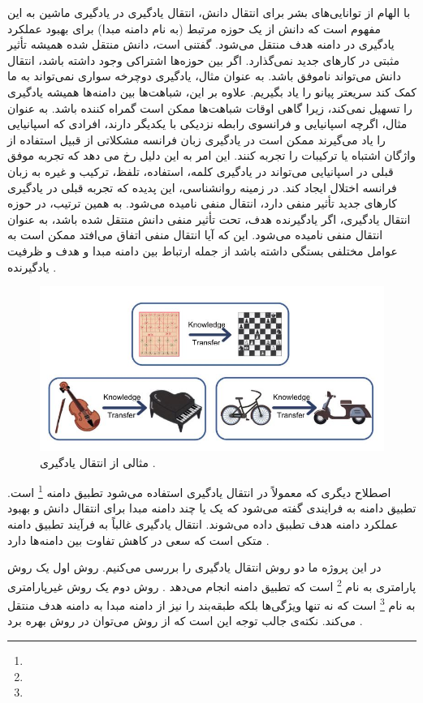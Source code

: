 {	 با الهام از توانایی‌های بشر برای انتقال دانش، انتقال یادگیری در یادگیری ماشین به این مفهوم است که دانش از یک حوزه مرتبط (به نام دامنه مبدا) برای بهبود عملکرد یادگیری در دامنه هدف منتقل می‌شود. گفتنی است، دانش منتقل شده همیشه تأثیر مثبتی در کارهای جدید نمی‌گذارد. اگر بین حوزه‌ها اشتراکی وجود داشته باشد، انتقال دانش می‌تواند ناموفق باشد. به عنوان مثال، یادگیری دوچرخه سواری نمی‌تواند به ما کمک کند سریعتر پیانو را یاد بگیریم. علاوه بر این، شباهت‌ها بین دامنه‌ها همیشه یادگیری را تسهیل نمی‌کند، زیرا گاهی اوقات شباهت‌ها ممکن است گمراه کننده باشد. به عنوان مثال‌، اگرچه اسپانیایی و فرانسوی رابطه نزدیکی با یکدیگر دارند، افرادی که اسپانیایی را یاد می‌گیرند ممکن است در یادگیری زبان فرانسه مشکلاتی از قبیل استفاده از واژگان اشتباه یا ترکیبات را تجربه کنند. این امر به این دلیل رخ می دهد که تجربه موفق قبلی در اسپانیایی می‌تواند در یادگیری کلمه، استفاده، تلفظ، ترکیب و غیره به زبان فرانسه اختلال ایجاد کند. در زمینه روانشناسی، این پدیده که تجربه قبلی در یادگیری کارهای جدید تأثیر منفی دارد، انتقال منفی نامیده می‌شود. به همین ترتیب، در حوزه انتقال یادگیری، اگر یادگیرنده هدف، تحت تأثیر منفی دانش منتقل شده باشد، به عنوان انتقال منفی نامیده می‌شود. این که آیا انتقال منفی اتفاق می‌افتد ممکن است به عوامل مختلفی بستگی داشته باشد از جمله ارتباط بین دامنه مبدا و هدف و ظرفیت یادگیرنده
	\cite{zhuang2020comprehensive}.
	\begin{figure}
		\centering
		\includegraphics[scale=0.4]{images/example.jpg}
		\caption{مثالی از انتقال یادگیری \cite{zhuang2020comprehensive}.}
		\label{fig:9}
	\end{figure}

	اصطلاح دیگری که معمولاً در انتقال یادگیری استفاده می‌شود تطبیق دامنه
	 \footnote{}
	 است. تطبیق دامنه به فرایندی گفته می‌شود که یک یا چند دامنه مبدا برای انتقال دانش و بهبود عملکرد دامنه هدف تطببق داده می‌شوند. انتقال یادگیری غالباً به فرآیند تطبیق دامنه متکی است که سعی در کاهش تفاوت بین دامنه‌ها دارد
	 \cite{weiss2016survey}.
	
	در این پروژه ما دو روش انتقال یادگیری را بررسی می‌کنیم. روش اول یک روش پارامتری به نام
	\footnote{}
	 است که تطبیق دامنه انجام می‌دهد
	\cite{wang2017balanced}.
	روش دوم یک روش غیرپارامتری به نام 
	\footnote{}
	است که نه تنها ویژگی‌ها بلکه طبقه‌بند را نیز از دامنه مبدا به دامنه هدف منتقل می‌کند. نکته‌ی جالب توجه این است که از روش 
	می‌توان در روش 
	بهره برد
	\cite{wang2019easy}. 
}